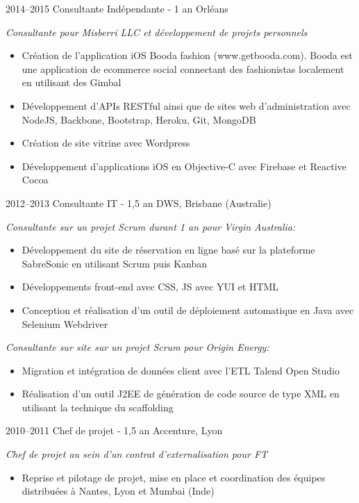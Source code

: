 \documentclass[hidelinks]{friggeri-cv} %
\begin{document}
\begin{entrylist}
\entry
{2014--2015}
{Consultante Indépendante  {\normalfont - 1 an}}
{Orléans}
{\emph{Consultante pour Misberri LLC et développement de projets personnels}
\begin{itemize}
\item Création de l'application iOS Booda fashion (www.getbooda.com). Booda est une application de ecommerce social connectant des fashionistas localement en utilisant des Gimbal 
\item Développement d'APIs RESTful ainsi que de sites web d'administration avec NodeJS, Backbone, Bootstrap, Heroku, Git, MongoDB
\item Création de site vitrine avec Wordpress
\item Développement d'applications iOS en Objective-C avec Firebase et Reactive Cocoa
\end{itemize}
\vspace*{3mm}}
\entry
{2012--2013}
{Consultante IT {\normalfont - 1,5 an}}
{DWS, Brisbane (Australie)}
{\emph{Consultante sur un projet Scrum durant 1 an pour Virgin Australia:}
\begin{itemize}
\item Développement du site de réservation en ligne basé sur la plateforme SabreSonic en utilisant Scrum puis Kanban
\item Développements front-end avec CSS, JS avec YUI et HTML 
\item Conception et réalisation d'un outil de déploiement automatique en Java avec Selenium Webdriver
\end{itemize}
\vspace*{3mm} 
\emph{Consultante sur site sur un projet Scrum pour Origin Energy:}
\begin{itemize}
\item Migration et intégration de données client avec l'ETL Talend Open Studio
\item Réalisation d'un outil J2EE de génération de code source de type XML en utilisant la technique du scaffolding
\end{itemize}
\vspace*{3mm}}
\entry
{2010--2011}
{Chef de projet {\normalfont - 1,5 an}}
{Accenture, Lyon}
{\emph{Chef de projet au sein d'un contrat d'externalisation pour FT}
\begin{itemize}
\item Reprise et pilotage de projet, mise en place et coordination des équipes distribuées à Nantes, Lyon et Mumbai (Inde)

\end{itemize}}
\end{entrylist}
\end{document}
